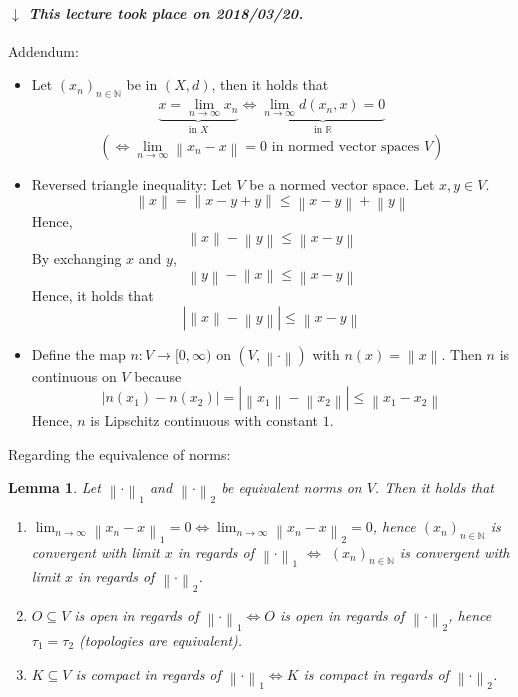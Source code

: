 \documentclass{article}
\newtheorem{lemma}{Lemma}  \numberwithin{lemma}{section}
\newcommand{\norm}[1]{\left\|#1\right\|}
\newcommand{\card}[1]{\left|#1\right|}
\newcommand{\dateref}[1]{%
  \begin{mdframed}[backgroundcolor=gray!10,innerbottommargin=0pt,innertopmargin=0pt]
    \paragraph{\textit{$\downarrow$ This lecture took place on #1.}}%
  \end{mdframed}%
}
\begin{document}
\dateref{2018/03/20}

Addendum:
\begin{itemize}
  \item Let $(x_n)_{n \in \mathbb N}$ be in $(X, d)$, then it holds that
    \[ \underbrace{x = \lim_{n\to\infty} x_n}_{\text{in } X} \iff \underbrace{\lim_{n\to\infty} d(x_n, x) = 0}_{\text{in } \mathbb R} \]
    \[ (\iff \lim_{n\to\infty} \norm{x_n - x} = 0 \text{ in normed vector spaces } V) \]
  \item Reversed triangle inequality: Let $V$ be a normed vector space. Let $x, y \in V$.
    \[ \norm{x} = \norm{x - y + y} \leq \norm{x - y} + \norm{y} \]
    Hence,
    \[ \norm{x} - \norm{y} \leq \norm{x - y} \]
    By exchanging $x$ and $y$,
    \[ \norm{y} - \norm{x} \leq \norm{x - y} \]
    Hence, it holds that
    \[ \card{\norm x - \norm y} \leq \norm{x - y} \]
  \item Define the map $n: V \to [0, \infty)$ on $(V, \norm{\cdot})$ with $n(x) = \norm{x}$.
    Then $n$ is continuous on $V$ because
    \[ \card{n(x_1) - n(x_2)} = \card{\norm{x_1} - \norm{x_2}} \leq \norm{x_1 - x_2} \]
    Hence, $n$ is Lipschitz continuous with constant $1$.
\end{itemize}

Regarding the equivalence of norms:

\begin{lemma} %
  Let $\norm{\cdot}_1$ and $\norm{\cdot}_2$ be equivalent norms on $V$. Then it holds that
  \begin{enumerate}
    \item $\lim_{n\to\infty} \norm{x_n - x}_1 = 0 \iff \lim_{n\to\infty} \norm{x_n - x}_2 = 0$,
      hence $(x_n)_{n\in\mathbb N}$ is convergent with limit $x$ in regards of $\norm{\cdot}_1$
      $\iff$ $(x_n)_{n\in\mathbb N}$ is convergent with limit $x$ in regards of $\norm{\cdot}_2$.
    \item $O \subseteq V$ is open in regards of $\norm{\cdot}_1 \iff O$ is open in regards of $\norm{\cdot}_2$,
      hence $\tau_1 = \tau_2$ (topologies are equivalent).
    \item $K \subseteq V$ is compact in regards of $\norm{\cdot}_1 \iff K$ is compact in regards of $\norm{\cdot}_2$.
  \end{enumerate}
\end{lemma}
\end{document}
